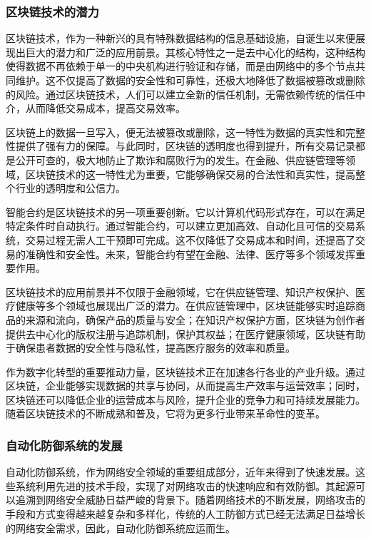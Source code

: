 \subsubsection{区块链技术的潜力}

区块链技术，作为一种新兴的具有特殊数据结构的信息基础设施，自诞生以来便展现出巨大的潜力和广泛的应用前景。其核心特性之一是去中心化的结构，这种结构使得数据不再依赖于单一的中央机构进行验证和存储，而是由网络中的多个节点共同维护。这不仅提高了数据的安全性和可靠性，还极大地降低了数据被篡改或删除的风险。通过区块链技术，人们可以建立全新的信任机制，无需依赖传统的信任中介，从而降低交易成本，提高交易效率。

区块链上的数据一旦写入，便无法被篡改或删除，这一特性为数据的真实性和完整性提供了强有力的保障。与此同时，区块链的透明度也得到提升，所有交易记录都是公开可查的，极大地防止了欺诈和腐败行为的发生。在金融、供应链管理等领域，区块链技术的这一特性尤为重要，它能够确保交易的合法性和真实性，提高整个行业的透明度和公信力。

智能合约是区块链技术的另一项重要创新。它以计算机代码形式存在，可以在满足特定条件时自动执行。通过智能合约，可以建立更加高效、自动化且可信的交易系统，交易过程无需人工干预即可完成。这不仅降低了交易成本和时间，还提高了交易的准确性和安全性。未来，智能合约有望在金融、法律、医疗等多个领域发挥重要作用。

区块链技术的应用前景并不仅限于金融领域，它在供应链管理、知识产权保护、医疗健康等多个领域也展现出广泛的潜力。在供应链管理中，区块链能够实时追踪商品的来源和流向，确保产品的质量与安全；在知识产权保护方面，区块链为创作者提供去中心化的版权注册与追踪机制，保护其权益；在医疗健康领域，区块链有助于确保患者数据的安全性与隐私性，提高医疗服务的效率和质量。

作为数字化转型的重要推动力量，区块链技术正在加速各行各业的产业升级。通过区块链，企业能够实现数据的共享与协同，从而提高生产效率与运营效率；同时，区块链还可以降低企业的运营成本与风险，提升企业的竞争力和可持续发展能力。随着区块链技术的不断成熟和普及，它将为更多行业带来革命性的变革。

\subsubsection{自动化防御系统的发展}

自动化防御系统，作为网络安全领域的重要组成部分，近年来得到了快速发展。这些系统利用先进的技术手段，实现了对网络攻击的快速响应和有效防御。其起源可以追溯到网络安全威胁日益严峻的背景下。随着网络技术的不断发展，网络攻击的手段和方式变得越来越复杂和多样化，传统的人工防御方式已经无法满足日益增长的网络安全需求，因此，自动化防御系统应运而生。

